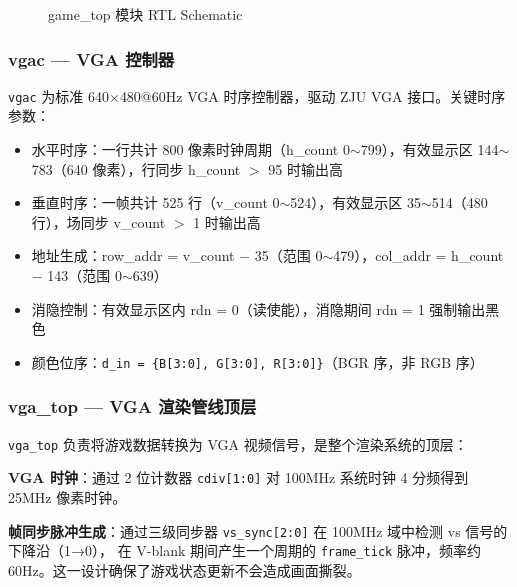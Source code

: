 \documentclass[12pt,a4paper]{ctexart}
\begin{document}
\begin{figure}[H]
\centering
\caption{game\_top 模块 RTL Schematic}
\label{fig:gametop_rtl}
\end{figure}

\subsubsection{vgac --- VGA 控制器}

\texttt{vgac} 为标准 640$\times$480@60Hz VGA 时序控制器，驱动 ZJU VGA 接口。关键时序参数：

\begin{itemize}
    \item 水平时序：一行共计 800 像素时钟周期（h\_count 0$\sim$799），有效显示区 144$\sim$783（640 像素），行同步 h\_count $>$ 95 时输出高
    \item 垂直时序：一帧共计 525 行（v\_count 0$\sim$524），有效显示区 35$\sim$514（480 行），场同步 v\_count $>$ 1 时输出高
    \item 地址生成：row\_addr = v\_count $-$ 35（范围 0$\sim$479），col\_addr = h\_count $-$ 143（范围 0$\sim$639）
    \item 消隐控制：有效显示区内 rdn = 0（读使能），消隐期间 rdn = 1 强制输出黑色
    \item 颜色位序：\texttt{d\_in = \{B[3:0], G[3:0], R[3:0]\}}（BGR 序，非 RGB 序）
\end{itemize}

\subsubsection{vga\_top --- VGA 渲染管线顶层}

\texttt{vga\_top} 负责将游戏数据转换为 VGA 视频信号，是整个渲染系统的顶层：

\textbf{VGA 时钟}：通过 2 位计数器 \texttt{cdiv[1:0]} 对 100MHz 系统时钟 4 分频得到 25MHz 像素时钟。

\textbf{帧同步脉冲生成}：通过三级同步器 \texttt{vs\_sync[2:0]} 在 100MHz 域中检测 vs 信号的下降沿（1→0），
在 V-blank 期间产生一个周期的 \texttt{frame\_tick} 脉冲，频率约 60Hz。这一设计确保了游戏状态更新不会造成画面撕裂。
\end{document}

